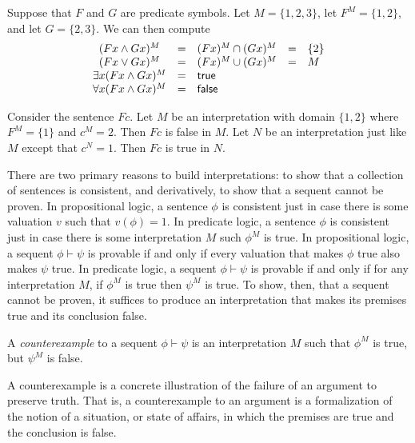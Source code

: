 \begin{example} Suppose that $F$ and $G$ are predicate symbols.  Let
  $M=\{ 1,2,3\}$, let $F^M=\{ 1,2\}$, and let $G=\{ 2,3\}$.  We can
  then compute
\[ \begin{array}{c c l c l} (Fx\wedge Gx)^M & = & (Fx)^M\cap (Gx)^M
     & = & \{ 2\}   \\
     (Fx\vee Gx)^M & = & (Fx)^M\cup (Gx)^M & = & M \\
     \exists x(Fx\wedge Gx)^M & = & \mathsf{true} \\
   \forall x(Fx\wedge Gx)^M & = &
                                  \mathsf{false}  \end{array} \]  \end{example}

\begin{example} Consider the sentence $Fc$.  Let $M$ be an
  interpretation with domain $\{ 1,2\}$ where $F^M=\{ 1\}$ and
  $c^M=2$.  Then $Fc$ is false in $M$.  Let $N$ be an interpretation
  just like $M$ except that $c^N=1$.  Then $Fc$ is true in
  $N$. \end{example}
                            
There are two primary reasons to build interpretations: to show that a
collection of sentences is consistent, and derivatively, to show that
a sequent cannot be proven.  In propositional logic, a sentence $\phi$
is consistent just in case there is some valuation $v$ such that
$v(\phi )=1$.  In predicate logic, a sentence $\phi$ is consistent
just in case there is some interpretation $M$ such $\phi ^M$ is true.
In propositional logic, a sequent $\phi\vdash\psi$ is provable if and
only if every valuation that makes $\phi$ true also makes $\psi$ true.
In predicate logic, a sequent $\phi\vdash\psi$ is provable if and only
if for any interpretation $M$, if $\phi ^M$ is true then $\psi ^M$ is
true.  To show, then, that a sequent cannot be proven, it suffices to
produce an interpretation that makes its premises true and its
conclusion false.

\begin{defn} A \emph{\gls{counterexample}} to a sequent
  $\phi\vdash\psi$ is an interpretation $M$ such that $\phi ^M$ is
  true, but $\psi ^M$ is false. \end{defn}

A counterexample is a concrete illustration of the failure of an
argument to preserve truth.  That is, a counterexample to an argument
is a formalization of the notion of a situation, or state of affairs,
in which the premises are true and the conclusion is false.

